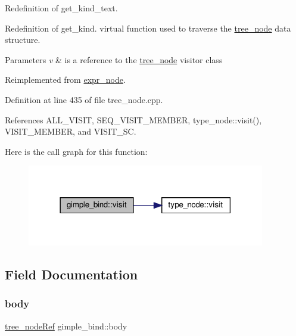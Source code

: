 Redefinition of get\+\_\+kind\+\_\+text. 

Redefinition of get\+\_\+kind. virtual function used to traverse the \hyperlink{classtree__node}{tree\+\_\+node} data structure. 
\begin{DoxyParams}{Parameters}
{\em v} & is a reference to the \hyperlink{classtree__node}{tree\+\_\+node} visitor class \\
\hline
\end{DoxyParams}


Reimplemented from \hyperlink{structexpr__node_aac767878f13ca07371dde2c3938ef38a}{expr\+\_\+node}.



Definition at line 435 of file tree\+\_\+node.\+cpp.



References A\+L\+L\+\_\+\+V\+I\+S\+IT, S\+E\+Q\+\_\+\+V\+I\+S\+I\+T\+\_\+\+M\+E\+M\+B\+ER, type\+\_\+node\+::visit(), V\+I\+S\+I\+T\+\_\+\+M\+E\+M\+B\+ER, and V\+I\+S\+I\+T\+\_\+\+SC.

Here is the call graph for this function\+:
\nopagebreak
\begin{figure}[H]
\begin{center}
\leavevmode
\includegraphics[width=294pt]{d9/d93/structgimple__bind_a63a576886251512f6238e7055819869f_cgraph}
\end{center}
\end{figure}


\subsection{Field Documentation}
\mbox{\label{structgimple__bind_a24cdde21e41023e335d38bc9ef59daae}} 
\subsubsection{\texorpdfstring{body}{body}}
{\footnotesize\ttfamily \hyperlink{tree__node_8hpp_a6ee377554d1c4871ad66a337eaa67fd5}{tree\+\_\+node\+Ref} gimple\+\_\+bind\+::body}




